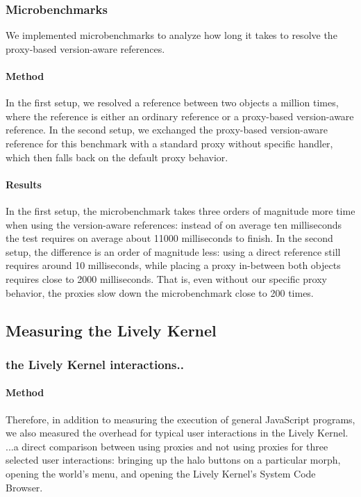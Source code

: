 \subsubsection{Microbenchmarks}

We implemented microbenchmarks to analyze how long it takes to resolve the proxy-based version-aware references.

\paragraph{Method}
In the first setup, we resolved a reference between two objects a million times, where the reference is either an ordinary reference or a proxy-based version-aware reference.
In the second setup, we exchanged the proxy-based version-aware reference for this benchmark with a standard proxy without specific handler, which then falls back on the default proxy behavior.

\paragraph{Results}
In the first setup, the microbenchmark takes three orders of magnitude more time when using the version-aware references: instead of on average ten milliseconds the test requires on average about 11000 milliseconds to finish.
In the second setup, the difference is an order of magnitude less: using a direct reference still requires around 10 milliseconds, while placing a proxy in-between both objects requires close to 2000 milliseconds.
That is, even without our specific proxy behavior, the proxies slow down the microbenchmark close to 200 times.



\subsection{Measuring the Lively Kernel}


\subsubsection{the Lively Kernel interactions..}


\paragraph{Method}
Therefore, in addition to measuring the execution of general JavaScript programs, we also measured the overhead for typical user interactions in the Lively Kernel.
...a direct comparison between using proxies and not using proxies for three selected user interactions: bringing up the halo buttons on a particular morph, opening the world's menu, and opening the Lively Kernel's System Code Browser.



